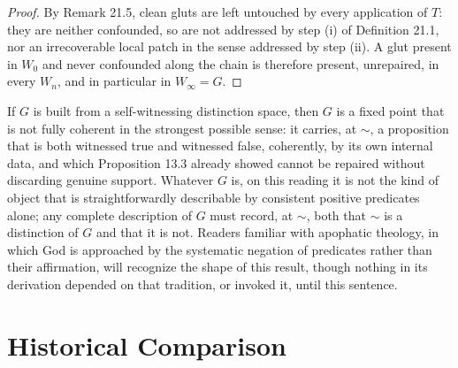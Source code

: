 \documentclass[11pt]{book}
\begin{document}
\begin{proof}
By Remark 21.5, clean gluts are left untouched by every application of $T$: they are neither confounded, so are not addressed by step (i) of Definition 21.1, nor an irrecoverable local patch in the sense addressed by step (ii). A glut present in $W_0$ and never confounded along the chain is therefore present, unrepaired, in every $W_n$, and in particular in $W_\infty = G$.
\end{proof}

If $G$ is built from a self-witnessing distinction space, then $G$ is a fixed point that is not fully coherent in the strongest possible sense: it carries, at $\sim$, a proposition that is both witnessed true and witnessed false, coherently, by its own internal data, and which Proposition 13.3 already showed cannot be repaired without discarding genuine support. Whatever $G$ is, on this reading it is not the kind of object that is straightforwardly describable by consistent positive predicates alone; any complete description of $G$ must record, at $\sim$, both that $\sim$ is a distinction of $G$ and that it is not. Readers familiar with apophatic theology, in which God is approached by the systematic negation of predicates rather than their affirmation, will recognize the shape of this result, though nothing in its derivation depended on that tradition, or invoked it, until this sentence.

\section{Historical Comparison}
\end{document}
